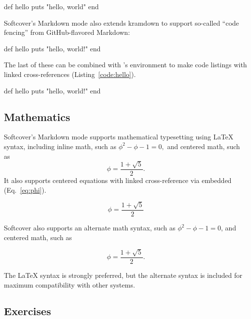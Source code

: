 \begin{code}
def hello
  puts "hello, world"
end
\end{code}

Softcover{}'s Markdown mode also extends kramdown to support so-called {}``code fencing{}'' from GitHub-flavored Markdown:

\begin{code}
def hello
  puts "hello, world!"
end
\end{code}

The last of these can be combined with \PolyTeX{}'s  environment to make code listings with linked cross-references (Listing~\ref{code:hello}).

\begin{codelisting}
\label{code:hello}
\begin{code}
def hello
  puts "hello, world!"
end
\end{code}
\end{codelisting}

\subsection{Mathematics}

Softcover{}'s Markdown mode supports mathematical typesetting using \LaTeX{} syntax, including inline math, such as \( \phi^2 - \phi - 1 = 0, \) and centered math, such as
\[ \phi = \frac{1+\sqrt{5}}{2}. \]
It also supports centered equations with linked cross-reference via embedded \PolyTeX{} (Eq.~\eqref{eq:phi}).

\begin{equation}
\label{eq:phi}
\phi = \frac{1+\sqrt{5}}{2}
\end{equation}

Softcover also supports an alternate math syntax, such as \(\phi^2 - \phi - 1 = 0\), and centered math, such as

\[\phi = \frac{1+\sqrt{5}}{2}.\]

The \LaTeX{} syntax is strongly preferred, but the alternate syntax is included for maximum compatibility with other systems.




\subsection{Exercises}


